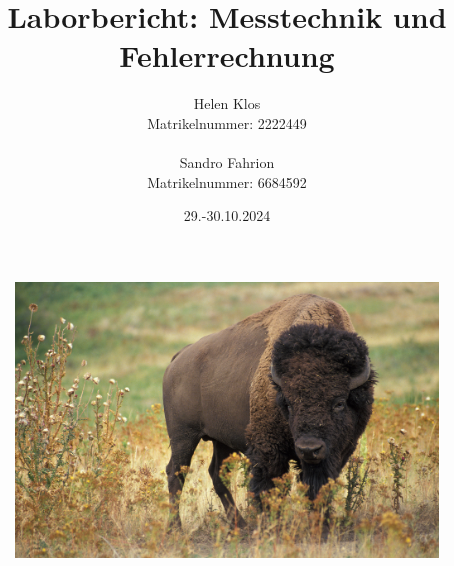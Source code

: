 \documentclass[a4paper,12pt]{article}
\title{Laborbericht: Messtechnik und Fehlerrechnung}
\author{Helen Klos \\Matrikelnummer: 2222449 \\ \\Sandro Fahrion \\Matrikelnummer: 6684592}
\date{29.-30.10.2024}
\begin{document}
\sloppy
\setlength{\emergencystretch}{5pt}
\maketitle

\begin{figure}[H]
    \centering
    \includegraphics[width=1.0\textwidth]{../Quellen/Labor2/Titelbild.jpg}
\end{figure}
\newpage
\tableofcontents
\newpage
\end{document}
